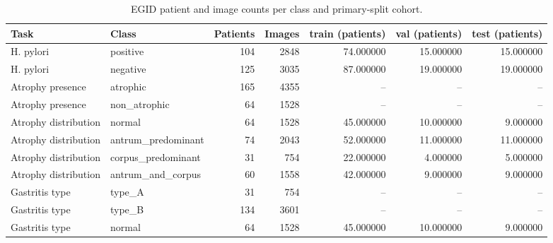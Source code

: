 \begin{table}
\caption{EGID patient and image counts per class and primary-split cohort.}
\label{tab:table1_dataset}
\begin{tabular}{llrrrrr}
\toprule
Task & Class & Patients & Images & train (patients) & val (patients) & test (patients) \\
\midrule
H. pylori & positive & 104 & 2848 & 74.000000 & 15.000000 & 15.000000 \\
H. pylori & negative & 125 & 3035 & 87.000000 & 19.000000 & 19.000000 \\
Atrophy presence & atrophic & 165 & 4355 & -- & -- & -- \\
Atrophy presence & non\_atrophic & 64 & 1528 & -- & -- & -- \\
Atrophy distribution & normal & 64 & 1528 & 45.000000 & 10.000000 & 9.000000 \\
Atrophy distribution & antrum\_predominant & 74 & 2043 & 52.000000 & 11.000000 & 11.000000 \\
Atrophy distribution & corpus\_predominant & 31 & 754 & 22.000000 & 4.000000 & 5.000000 \\
Atrophy distribution & antrum\_and\_corpus & 60 & 1558 & 42.000000 & 9.000000 & 9.000000 \\
Gastritis type & type\_A & 31 & 754 & -- & -- & -- \\
Gastritis type & type\_B & 134 & 3601 & -- & -- & -- \\
Gastritis type & normal & 64 & 1528 & 45.000000 & 10.000000 & 9.000000 \\
\bottomrule
\end{tabular}
\end{table}
